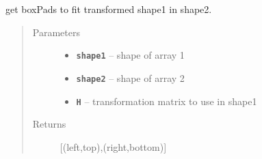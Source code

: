 \documentclass[letterpaper,10pt,english]{sphinxmanual}
\begin{document}
\begin{fulllineitems}
\label{RRtoolbox.lib.arrayops:RRtoolbox.lib.arrayops.basic.pad_to_fit_H}
get boxPads to fit transformed shape1 in shape2.
\begin{quote}\begin{description}
\item[{Parameters}] \leavevmode\begin{itemize}
\item {} 
\textbf{\texttt{shape1}} -- shape of array 1

\item {} 
\textbf{\texttt{shape2}} -- shape of array 2

\item {} 
\textbf{\texttt{H}} -- transformation matrix to use in shape1

\end{itemize}

\item[{Returns}] \leavevmode
{[}(left,top),(right,bottom){]}

\end{description}\end{quote}

\end{fulllineitems}

\end{document}
